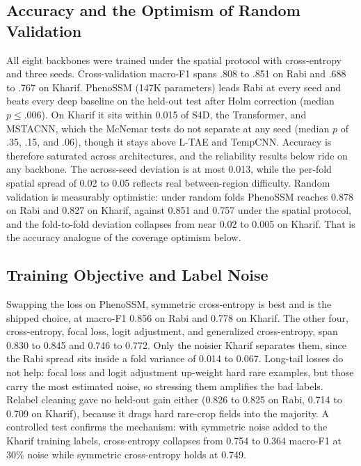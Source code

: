 \documentclass[conference]{IEEEtran}
\begin{document}
\subsection{Accuracy and the Optimism of Random Validation}\label{ssec:bench}
All eight backbones were trained under the spatial protocol with cross-entropy and
three seeds. Cross-validation macro-F1 spans .808 to .851 on Rabi and .688 to .767 on
Kharif. PhenoSSM (147K parameters) leads Rabi at every seed and beats every deep
baseline on the held-out test after Holm correction (median $p\le.006$). On Kharif it
sits within 0.015 of S4D, the Transformer, and MSTACNN, which the McNemar tests do not
separate at any seed (median $p$ of .35, .15, and .06), though it stays above L-TAE
and TempCNN. Accuracy is therefore saturated across architectures, and the reliability
results below ride on any backbone. The across-seed deviation is at most 0.013, while
the per-fold spatial spread of 0.02 to 0.05 reflects real between-region difficulty.
Random validation is measurably optimistic: under random folds PhenoSSM reaches 0.878
on Rabi and 0.827 on Kharif, against 0.851 and 0.757 under the spatial protocol, and
the fold-to-fold deviation collapses from near 0.02 to 0.005 on Kharif. That is the
accuracy analogue of the coverage optimism below.

\subsection{Training Objective and Label Noise}\label{ssec:loss}
Swapping the loss on PhenoSSM, symmetric cross-entropy is best and is the shipped
choice, at macro-F1 0.856 on Rabi and 0.778 on Kharif. The other four, cross-entropy,
focal loss, logit adjustment, and generalized cross-entropy, span 0.830 to 0.845 and
0.746 to 0.772. Only the noisier Kharif separates them, since the Rabi spread sits
inside a fold variance of 0.014 to 0.067. Long-tail losses do not help: focal loss and
logit adjustment up-weight hard rare examples, but those carry the most estimated
noise, so stressing them amplifies the bad labels. Relabel cleaning gave no held-out
gain either (0.826 to 0.825 on Rabi, 0.714 to 0.709 on Kharif), because it drags hard
rare-crop fields into the majority. A controlled test confirms the mechanism: with
symmetric noise added to the Kharif training labels, cross-entropy collapses from
0.754 to 0.364 macro-F1 at 30\% noise while symmetric cross-entropy holds at 0.749.
\end{document}
